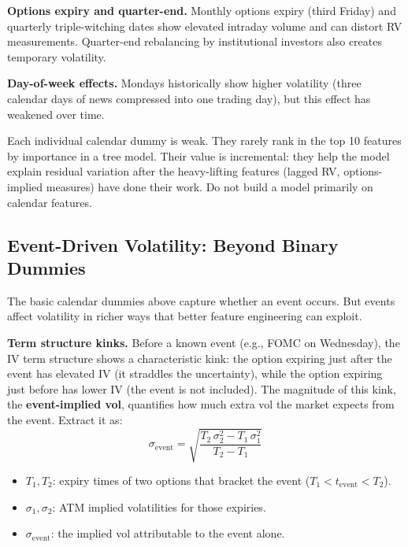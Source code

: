 \textbf{Options expiry and quarter-end.}
Monthly options expiry (third Friday) and quarterly triple-witching dates show elevated intraday volume and can distort RV measurements.
Quarter-end rebalancing by institutional investors also creates temporary volatility.

\textbf{Day-of-week effects.}
Mondays historically show higher volatility (three calendar days of news compressed into one trading day), but this effect has weakened over time.

\begin{warning}
Each individual calendar dummy is weak.
They rarely rank in the top 10 features by importance in a tree model.
Their value is incremental: they help the model explain residual variation after the heavy-lifting features (lagged RV, options-implied measures) have done their work.
Do not build a model primarily on calendar features.
\end{warning}

\subsection{Event-Driven Volatility: Beyond Binary Dummies}\label{sec:feat-event-vol}

The basic calendar dummies above capture whether an event occurs.
But events affect volatility in richer ways that better feature engineering can exploit.

\textbf{Term structure kinks.}
Before a known event (e.g., FOMC on Wednesday), the IV term structure shows a characteristic kink: the option expiring just after the event has elevated IV (it straddles the uncertainty), while the option expiring just before has lower IV (the event is not included).
The magnitude of this kink, the \textbf{event-implied vol}, quantifies how much extra vol the market expects from the event.
Extract it as:
\begin{equation}\label{eq:event-implied-vol}
  \sigma_{\text{event}} = \sqrt{\frac{T_2\,\sigma_2^2 - T_1\,\sigma_1^2}{T_2 - T_1}}
\end{equation}
\begin{itemize}[nosep]
  \item $T_1, T_2$: expiry times of two options that bracket the event ($T_1 < t_{\text{event}} < T_2$).
  \item $\sigma_1, \sigma_2$: ATM implied volatilities for those expiries.
  \item $\sigma_{\text{event}}$: the implied vol attributable to the event alone.
\end{itemize}

